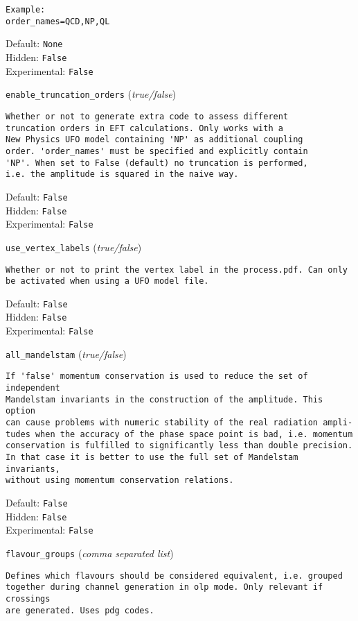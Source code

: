 \begin{basedescript}{\desclabelstyle{\pushlabel}}
\begin{verbatim}
Example:
order_names=QCD,NP,QL
\end{verbatim}
Default: \verb|None|
\\Hidden: \verb|False|
\\Experimental: \verb|False|
\\\item[\colorbox{gray!30}{\texttt{enable\_truncation\_orders}}] (\textit{true/false})
\begin{verbatim}
Whether or not to generate extra code to assess different
truncation orders in EFT calculations. Only works with a
New Physics UFO model containing 'NP' as additional coupling
order. 'order_names' must be specified and explicitly contain
'NP'. When set to False (default) no truncation is performed,
i.e. the amplitude is squared in the naive way.
\end{verbatim}
Default: \verb|False|
\\Hidden: \verb|False|
\\Experimental: \verb|False|
\\\item[\colorbox{gray!30}{\texttt{use\_vertex\_labels}}] (\textit{true/false})
\begin{verbatim}
Whether or not to print the vertex label in the process.pdf. Can only
be activated when using a UFO model file.
\end{verbatim}
Default: \verb|False|
\\Hidden: \verb|False|
\\Experimental: \verb|False|
\\\item[\colorbox{gray!30}{\texttt{all\_mandelstam}}] (\textit{true/false})
\begin{verbatim}
If 'false' momentum conservation is used to reduce the set of independent
Mandelstam invariants in the construction of the amplitude. This option
can cause problems with numeric stability of the real radiation ampli-
tudes when the accuracy of the phase space point is bad, i.e. momentum
conservation is fulfilled to significantly less than double precision.
In that case it is better to use the full set of Mandelstam invariants,
without using momentum conservation relations.
\end{verbatim}
Default: \verb|False|
\\Hidden: \verb|False|
\\Experimental: \verb|False|
\\\item[\colorbox{gray!30}{\texttt{flavour\_groups}}] (\textit{comma separated list})
\begin{verbatim}
Defines which flavours should be considered equivalent, i.e. grouped
together during channel generation in olp mode. Only relevant if crossings
are generated. Uses pdg codes.


\end{verbatim}
\end{basedescript}
